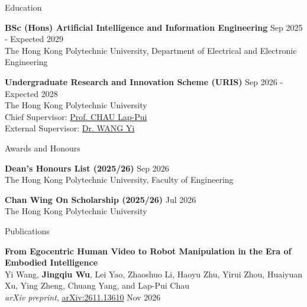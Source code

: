\documentclass{resume} %
\begin{document}
\begin{rSection}{Education}

{\bf BSc (Hons) Artificial Intelligence and Information Engineering} \hfill {Sep 2025 - Expected 2029}\\
The Hong Kong Polytechnic University, Department of Electrical and Electronic Engineering

\vspace{0.3cm}
\textbf{Undergraduate Research and Innovation Scheme (URIS)} \hfill Sep 2026 - Expected 2028\\
The Hong Kong Polytechnic University \\
Chief Supervisor: \href{https://www.polyu.edu.hk/eee/people/academic-staff-and-teaching-staff/prof-chau-lap-pui/}{Prof. CHAU Lap-Pui} \\
External Supervisor: \href{https://research.polyu.edu.hk/en/persons/yi-wang-3/}{Dr. WANG Yi}

\end{rSection}

\vspace{0.6cm}
\begin{rSection}{Awards and Honours}

\textbf{Dean's Honours List (2025/26)} \hfill Sep 2026\\
The Hong Kong Polytechnic University, Faculty of Engineering

\vspace{0.3cm}
\textbf{Chan Wing On Scholarship (2025/26)} \hfill Jul 2026\\
The Hong Kong Polytechnic University

\end{rSection}

\vspace{0.6cm}
\begin{rSection}{Publications}

\textbf{From Egocentric Human Video to Robot Manipulation in the Era of Embodied Intelligence} \\
Yi Wang, \textbf{Jingqiu Wu}, Lei Yao, Zhaoshuo Li, Haoyu Zhu, Yirui Zhou, Huaiyuan Xu, Ying Zheng, Chuang Yang, and Lap-Pui Chau \\
\textit{arXiv preprint}, \href{https://arxiv.org/abs/2611.13610}{arXiv:2611.13610} \hfill Nov 2026

\end{rSection}
\end{document}
